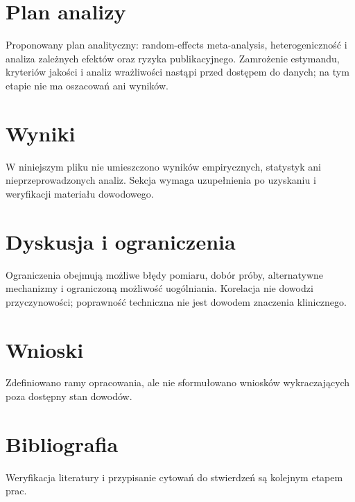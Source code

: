 \documentclass[11pt,a4paper]{article}
\begin{document}
\section{Plan analizy}

Proponowany plan analityczny: random-effects meta-analysis, heterogeniczność i analiza zależnych efektów oraz ryzyka publikacyjnego. Zamrożenie estymandu, kryteriów jakości i analiz wrażliwości nastąpi przed dostępem do danych; na tym etapie nie ma oszacowań ani wyników.

\section{Wyniki}

W niniejszym pliku nie umieszczono wyników empirycznych, statystyk ani nieprzeprowadzonych analiz. Sekcja wymaga uzupełnienia po uzyskaniu i weryfikacji materiału dowodowego.

\section{Dyskusja i ograniczenia}

Ograniczenia obejmują możliwe błędy pomiaru, dobór próby, alternatywne mechanizmy i ograniczoną możliwość uogólniania. Korelacja nie dowodzi przyczynowości; poprawność techniczna nie jest dowodem znaczenia klinicznego.

\section{Wnioski}

Zdefiniowano ramy opracowania, ale nie sformułowano wniosków wykraczających poza dostępny stan dowodów.

\section*{Bibliografia}

Weryfikacja literatury i przypisanie cytowań do stwierdzeń są kolejnym etapem prac.
\end{document}
